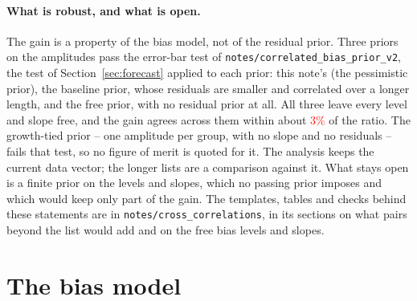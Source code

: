\documentclass[11pt]{article}
\newif\ifnumbersfinal
\newcommand{\refresh}[1]{\ifnumbersfinal#1\else\textcolor{red}{#1}\fi}
\newcommand{\PairPriorSpread}{\refresh{$3\%$}}
\begin{document}
\paragraph{What is robust, and what is open.}
The gain is a property of the bias model, not of the residual prior.
Three priors on the amplitudes pass the error-bar test of
\texttt{notes/correlated\_bias\_prior\_v2}, the test of
Section~\ref{sec:forecast} applied to each prior: this note's (the
pessimistic prior), the
baseline prior, whose residuals are smaller and correlated over a
longer length, and the free prior, with no residual prior at all.
All three leave every level and slope free, and the gain agrees
across them within about \PairPriorSpread{} of the ratio.  The
growth-tied prior -- one amplitude per group, with no slope and no
residuals -- fails that test, so no figure of merit is quoted for
it.  The analysis keeps the current data vector; the longer lists
are a comparison against it.  What stays open is a finite prior on
the levels and slopes, which no passing prior imposes and which would
keep only part of the gain.  The templates, tables and
checks behind these statements are in
\texttt{notes/cross\_correlations}, in its sections on what pairs
beyond the list would add and on the free bias levels and slopes.

\section{The bias model}
\label{sec:model}
\end{document}
